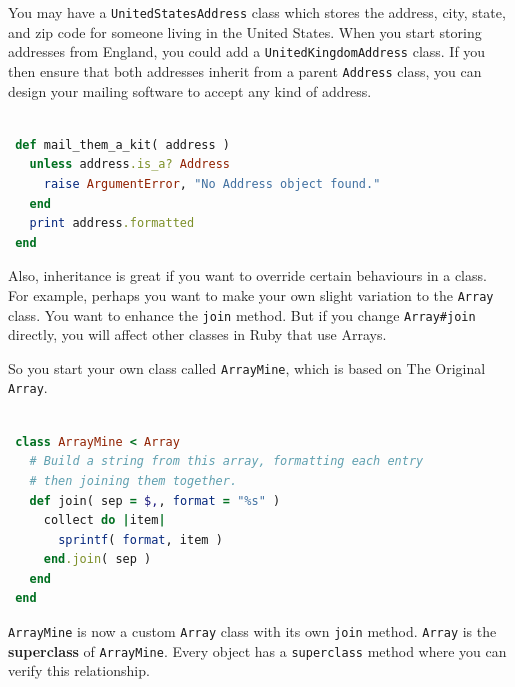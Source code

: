 \documentclass[10pt,twoside]{report}
\begin{document}
You may have a \lstinline[breaklines=true]|UnitedStatesAddress| class
which stores the address, city, state, and zip code for someone living
in the United States.  When you start storing addresses from England,
you could add a \lstinline[breaklines=true]|UnitedKingdomAddress|
class.  If you then ensure that both addresses inherit from a parent
\lstinline[breaklines=true]|Address| class, you can design your
mailing software to accept any kind of address.


\begin{lstlisting}[basicstyle=\ttfamily\color{basiccolor},
    commentstyle = \ttfamily\color{commentcolor},
    keywordstyle=\ttfamily\color{keywordscolor},
    stringstyle=\color{stringcolor},
    language=Ruby,
    basicstyle=\small\ttfamily,
    showstringspaces=false,
  ]

 def mail_them_a_kit( address )
   unless address.is_a? Address
     raise ArgumentError, "No Address object found."
   end
   print address.formatted
 end

\end{lstlisting}


Also, inheritance is great if you want to override certain behaviours
in a class. For example, perhaps you want to make your own slight
variation to the \lstinline[breaklines=true]|Array| class. You want to
enhance the \lstinline[breaklines=true]|join| method.  But if you
change \lstinline[breaklines=true]|Array#join| directly, you will
affect other classes in Ruby that use Arrays.

So you start your own class called
\lstinline[breaklines=true]|ArrayMine|, which is based on The Original
\lstinline[breaklines=true]|Array|.


\begin{lstlisting}[basicstyle=\ttfamily\color{basiccolor},
    commentstyle = \ttfamily\color{commentcolor},
    keywordstyle=\ttfamily\color{keywordscolor},
    stringstyle=\color{stringcolor},
    language=Ruby,
    basicstyle=\small\ttfamily,
    showstringspaces=false,
  ]

 class ArrayMine < Array
   # Build a string from this array, formatting each entry
   # then joining them together.
   def join( sep = $,, format = "%s" )
     collect do |item|
       sprintf( format, item )
     end.join( sep )
   end
 end

\end{lstlisting}


\lstinline[breaklines=true]|ArrayMine| is now a custom
\lstinline[breaklines=true]|Array| class with its own
\lstinline[breaklines=true]|join| method.
\lstinline[breaklines=true]|Array| is the {\bf superclass} of
\lstinline[breaklines=true]|ArrayMine|.  Every object has a
\lstinline[breaklines=true]|superclass| method where you can verify
this relationship.
\end{document}
